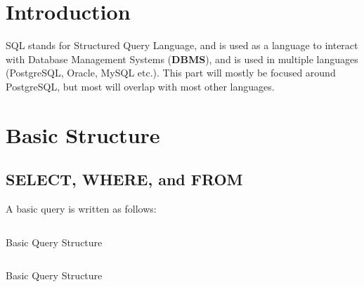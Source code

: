 \documentclass[12pt, letterpaper]{report}
\newcommand{\codein}[2]{\inputminted[fontsize=\large, breaklines, tabsize=4, breakanywhere]{#1}{#2}}
\newcommand{\listcodesc}[3]{
\begin{code}[H]
	\centering
	\codein{#1}{#2}
	\caption{#3}
\end{code}
}
\begin{document}
\chapter{Introduction}

SQL stands for Structured Query Language, and is used as a language to interact with Database Management Systems (\textbf{DBMS}), and is used in multiple languages (PostgreSQL, Oracle, MySQL etc.). This part will mostly be focused around PostgreSQL, but most will overlap with most other languages. 

\chapter{Basic Structure}

\section{SELECT, WHERE, and FROM}

A basic query is written as follows:

\begin{center}	
	\begin{code}
		\inputminted[fontsize=\large, centering, breaklines, tabsize=4, breakanywhere]{sql}{Example_001.sql}
		\caption{Basic Query Structure}
	\end{code}
\end{center}


\listcodesc{sql}{Example_001.sql}{Basic Query Structure}
\end{document}

